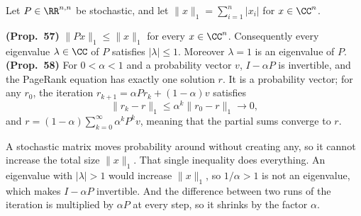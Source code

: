 \documentclass[10pt]{scrartcl}
\begin{document}
\begin{theorem*}
  Let $P\in\RR^{n,n}$ be stochastic, and let $\|x\|_1=\sum_{i=1}^n |x_i|$ for $x\in\CC^n$.
  \begin{enumerate}[(a)]
    \ii \textbf{(Prop.~57)} $\|Px\|_1\le \|x\|_1$ for every $x\in\CC^n$. Consequently every eigenvalue $\lambda\in\CC$ of $P$ satisfies $|\lambda|\le 1$. Moreover $\lambda=1$ is an eigenvalue of $P$.
    \ii \textbf{(Prop.~58)} For $0<\alpha<1$ and a probability vector $v$, $I-\alpha P$ is invertible, and the PageRank equation has exactly one solution $r$. It is a probability vector; for any $r_0$, the iteration $r_{k+1}=\alpha Pr_k+(1-\alpha)v$ satisfies
    \[
      \|r_k - r\|_1 \le \alpha^k \|r_0 - r\|_1 \longrightarrow 0,
    \]
    and $r=(1-\alpha)\sum_{k=0}^\infty \alpha^k P^k v$, meaning that the partial sums converge to $r$.
  \end{enumerate}
\end{theorem*}
\begin{ideabox}
  A stochastic matrix moves probability around without creating any, so it cannot increase the total size $\|x\|_1$. That single inequality does everything. An eigenvalue with $|\lambda|>1$ would increase $\|x\|_1$, so $1/\alpha>1$ is not an eigenvalue, which makes $I-\alpha P$ invertible. And the difference between two runs of the iteration is multiplied by $\alpha P$ at every step, so it shrinks by the factor $\alpha$.
\end{ideabox}
\end{document}
